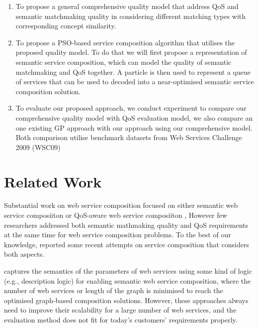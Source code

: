 \documentclass{IEEEtran}
\begin{document}
\begin{enumerate}
 \item To propose a general comprehensive quality model that address QoS and semantic matchmaking quality in considering different matching types with corresponding concept similarity.
  
 \item To propose a PSO-based service composition algorithm that utilises the proposed quality model. To do that we will first propose a representation of semantic service composition, which can model the quality of semantic matchmaking and QoS together. A particle is then used to represent a queue of services that can be used to decoded into a near-optimised semantic service composition solution.
  
 \item To evaluate our proposed approach, we conduct experiment to compare our comprehensive quality model with QoS evaluation model, we also compare an one existing GP approach with our approach using our comprehensive model. Both comparison utilise benchmark datasets from Web Services Challenge 2009 (WSC09) \cite{kona2009wsc} 
  
\end{enumerate}

\section{Related Work} \label{relatedWork}
Substantial work on web service composition focused on either semantic web service composiiton \cite{boustil2014semantic,mier2015integrated, bansal2016generalized} or QoS-aware web service composiiton \cite{da2016particle,da2015graphevol,yu2013adaptive, gupta2015optimization,qi2010combining,ma2015hybrid}, However few researchers addressed both semantic mathmaking quality and QoS requirements at the same time for web service composition problems. To the best of our knowledge, \cite{lecue2009optimizing,fanjiang2014semantic,pop2009immune} reported some recent attempts on service composition that considers both aspects.

\cite{boustil2014semantic,mier2015integrated, bansal2016generalized} captures the semantics of the parameters of web services using some kind of logic (e.g., description logic) for enabling semantic web service composition, where the number of web services or length of the graph is minimised to reach the optimised graph-based composition solutions. However, these approaches always need to improve their scalability for a large number of web services, and the evaluation method does not fit for today's customers' requirements properly.
\end{document}
